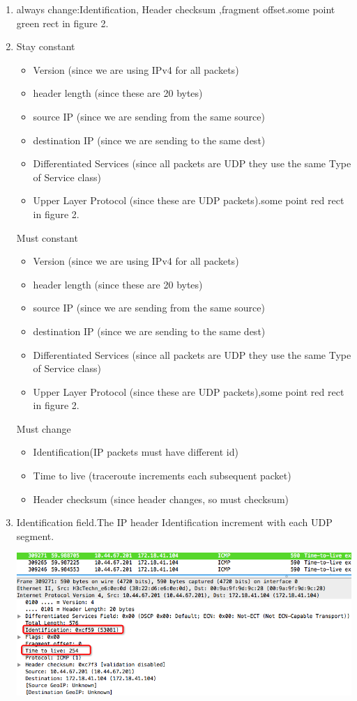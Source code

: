 \documentclass[a4paper]{article}
\begin{document}
{\begin{enumerate}
	\item always change:Identification, Header checksum ,fragment offset.some point green rect in figure 2.
	\item Stay constant
		\begin{itemize}
			\item Version (since we are using IPv4 for all packets)
			\item header length (since these are 20 bytes)
			\item source IP (since we are sending from the same source)
			\item destination IP (since we are sending to the same dest)
			\item Differentiated Services (since all packets are UDP they use the same Type of Service class)
			\item Upper Layer Protocol (since these are UDP packets).some point red rect in figure 2.
		\end{itemize}
	   Must constant
		\begin{itemize}
			\item Version (since we are using IPv4 for all packets)
			 \item header length (since these are 20 bytes)
			 \item source IP (since we are sending from the same source)
			 \item destination IP (since we are sending to the same dest)
			 \item Differentiated Services (since all packets are UDP they use the same Type of Service class)
			 \item Upper Layer Protocol (since these are UDP packets),some point red rect in figure 2.
		   \end{itemize}
	 Must change
		\begin{itemize}
			\item Identification(IP packets must have different id)
			\item Time to live (traceroute increments each subsequent packet)
			\item Header checksum (since header changes, so must checksum)
		\end{itemize}
	\item Identification field.The IP header Identification increment with each UDP segment.
	\begin{center} \includegraphics[scale=0.5]{Illustrations/3.png} \end{center}

\end{enumerate}}
\end{document}
